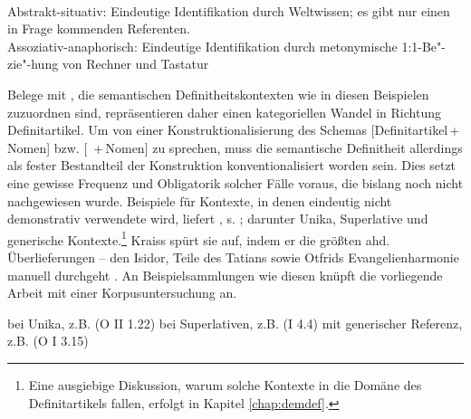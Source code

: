 \begin{exe}
	\ex 
	\begin{xlist} \label{ex:sem-def}\raggedright
		\ex \label{ex:sem-def1}  \\ Abstrakt-situativ: Eindeutige Identifikation durch Weltwissen; es gibt nur einen in Frage kommenden Referenten. 
		\ex \label{ex:sem-def2}   \\ Assoziativ-anaphorisch: Eindeutige Identifikation durch metonymische 1:1-Be"-zie"-hung von Rechner und Tastatur
		\end{xlist}
\end{exe}
\noindent
Belege mit , die semantischen Definitheitskontexten wie in diesen Beispielen zuzuordnen sind, repräsentieren daher einen kategoriellen Wandel in Richtung Definitartikel. Um von einer Konstruktionalisierung des Schemas [Definitartikel\,+\,Nomen] bzw. [ \,+\,Nomen] zu sprechen, muss die semantische Definitheit allerdings als fester Bestandteil der Konstruktion konventionalisiert worden sein. Dies setzt eine gewisse Frequenz und Obligatorik solcher Fälle voraus, die bislang noch nicht nachgewiesen wurde. Beispiele für Kontexte, in denen  eindeutig nicht demonstrativ verwendete wird, liefert \textcite[135ff.]{Kraiss2014}, s. ; darunter Unika, Superlative und generische Kontexte.\footnote{Eine ausgiebige Diskussion, warum solche Kontexte in die Domäne des Definitartikels fallen, erfolgt in Kapitel \ref{chap:demdef}.}  Kraiss spürt sie auf, indem er  die größten ahd. Überlieferungen -- den Isidor, Teile des Tatians sowie Otfrids Evangelienharmonie manuell durchgeht \parencite{Kraiss2012}. An Beispielsammlungen wie diesen \parencite[vgl. z.B. auch][]{Luhr2008,Schlachter2015} knüpft die vorliegende Arbeit mit einer Korpusuntersuchung an. 

\begin{exe}
	\ex 
	\begin{xlist} \label{ex:kraiss}
		\ex \label{ex:kraiss-unika}  bei Unika, z.B.  (O II 1.22) 
		\ex \label{ex:kraiss-superlativ}  bei Superlativen, z.B.  (I 4.4)
				\ex \label{ex:kraiss-generisch}  mit generischer Referenz, z.B.  (O I 3.15)
		\end{xlist}
\end{exe}

